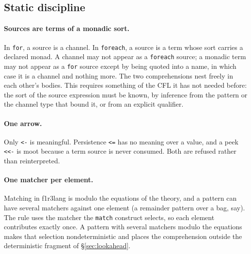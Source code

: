 \documentclass[11pt]{article}
\theoremstyle{branddef}
\theoremstyle{brandplain}
\theoremstyle{brandrem}
\newcommand{\fe}{\texttt{foreach}}
\newcommand{\flang}{\textsf{f1r3lang}}
\begin{document}
\subsection{Static discipline}
\label{sec:static}

\paragraph{Sources are terms of a monadic sort.} In \texttt{for}, a source is a
channel. In \fe{}, a source is a term whose sort carries a declared monad. A
channel may not appear as a \fe{} source; a monadic term may not appear as a
\texttt{for} source except by being quoted into a name, in which case it is a
channel and nothing more. The two comprehensions nest freely in each other's
bodies. This requires something of the CFL it has not needed before: the sort
of the source expression must be known, by inference from the pattern or the
channel type that bound it, or from an explicit qualifier.

\paragraph{One arrow.} Only \texttt{<-} is meaningful. Persistence \texttt{<=}
has no meaning over a value, and a peek \texttt{<<-} is moot because a term
source is never consumed. Both are refused rather than reinterpreted.

\paragraph{One matcher per element.} Matching in \flang{} is modulo the
equations of the theory, and a pattern can have several matchers against one
element (a remainder pattern over a bag, say). The rule uses the matcher the
\texttt{match} construct selects, so each element contributes exactly once. A
pattern with several matchers modulo the equations makes that selection
nondeterministic and places the comprehension outside the deterministic
fragment of \S\ref{sec:lookahead}.
\end{document}
